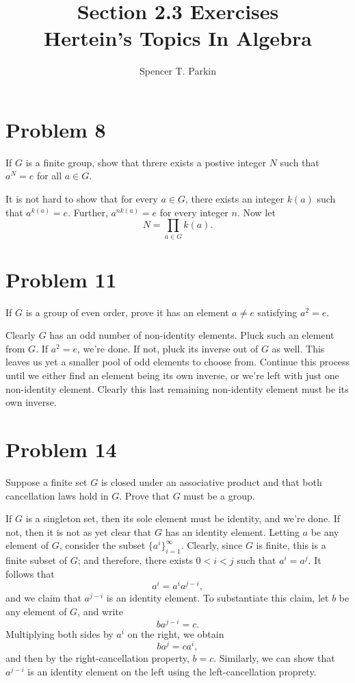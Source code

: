 \documentclass[12pt]{article}
\title{Section 2.3 Exercises\\Hertein's Topics In Algebra}
\author{Spencer T. Parkin}
\begin{document}
\maketitle

\section*{Problem 8}

If $G$ is a finite group, show that threre exists a postive integer $N$ such that $a^N=e$
for all $a\in G$.

It is not hard to show that for every $a\in G$, there exists an integer $k(a)$ such that $a^{k(a)}=e$.
Further, $a^{nk(a)}=e$ for every integer $n$.  Now let
\begin{equation*}
N=\prod_{a\in G} k(a).
\end{equation*}

\section*{Problem 11}

If $G$ is a group of even order, prove it has an element $a\neq e$ satisfying $a^2=e$.

Clearly $G$ has an odd number of non-identity elements.  Pluck such an element from $G$.
If $a^2=e$, we're done.  If not, pluck its inverse out of $G$ as well.  This leaves us yet
a smaller pool of odd elements to choose from.  Continue this process until we either find an
element being its own inverse, or we're left with just one non-identity element.  Clearly this
last remaining non-identity element must be its own inverse.

\section*{Problem 14}

Suppose a finite set $G$ is closed under an associative product and that
both cancellation laws hold in $G$.  Prove that $G$ must be a group.

If $G$ is a singleton set, then its sole element must be identity, and we're done.
If not, then it is not as yet clear that $G$ has an identity element.
Letting $a$ be any element of $G$, consider the subset $\{a^i\}_{i=1}^\infty$.  Clearly, since 
$G$ is finite, this is a finite subset of $G$; and therefore, there exists
$0<i<j$ such that $a^i=a^j$.  It follows that
\begin{equation*}
a^i = a^ia^{j-i},
\end{equation*}
and we claim that $a^{j-i}$ is an identity element.  To substantiate this claim, let $b$ be any element
of $G$, and write
\begin{equation*}
ba^{j-i}=c.
\end{equation*}
Multiplying both sides by $a^i$ on the right, we obtain
\begin{equation*}
ba^j = ca^i,
\end{equation*}
and then by the right-cancellation property, $b=c$.  Similarly, we can show that $a^{j-i}$ is an
identity element on the left using the left-cancellation proprety.
\end{document}
